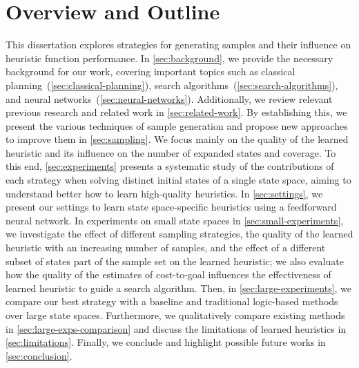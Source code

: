 \section{Overview and Outline}
\label{sec:outline}

This dissertation explores strategies for generating samples and their influence on heuristic function performance. In \cref{sec:background}, we provide the necessary background for our work, covering important topics such as classical planning~(\cref{sec:classical-planning}), search algorithms~(\cref{sec:search-algorithms}), and neural networks~(\cref{sec:neural-networks}). Additionally, we review relevant previous research and related work in \cref{sec:related-work}. By establishing this, we present the various techniques of sample generation and propose new approaches to improve them in \cref{sec:sampling}. We focus mainly on the quality of the learned heuristic and its influence on the number of expanded states and coverage. To this end, \cref{sec:experiments} presents a systematic study of the contributions of each strategy when solving distinct initial states of a single state space, aiming to understand better how to learn high-quality heuristics. In \cref{sec:settings}, we present our settings to learn state space-specific heuristics using a feedforward neural network. In experiments on small state spaces in \cref{sec:small-experiments}, we investigate the effect of different sampling strategies, the quality of the learned heuristic with an increasing number of samples, and the effect of a different subset of states part of the sample set on the learned heuristic; we also evaluate how the quality of the estimates of cost-to-goal influences the effectiveness of learned heuristic to guide a search algorithm. Then, in \cref{sec:large-experiments}, we compare our best strategy with a baseline and traditional logic-based methods over large state spaces. Furthermore, we qualitatively compare existing methods in \cref{sec:large-exps-comparison} and discuss the limitations of learned heuristics in \cref{sec:limitations}. Finally, we conclude and highlight possible future works in \cref{sec:conclusion}.
